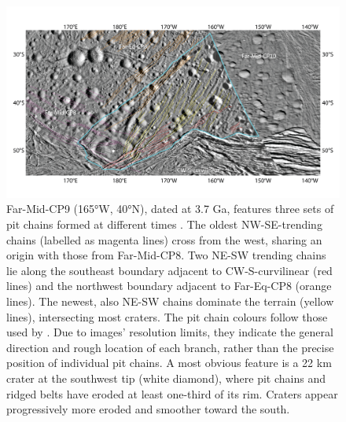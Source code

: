 \documentclass[preprint,12pt,3p,times,authoryear]{elsarticle}
\begin{document}
{\begin{figure}[t]
    \includegraphics[width=1.0\linewidth]{fig/FigS4B_Far-Mid-CP9.png}
    \caption{Far-Mid-CP9 (165°W, 40°N), dated at 3.7 Ga, features three sets of pit chains formed at different times \citep{Martin2014}. The oldest NW-SE-trending chains (labelled as magenta lines) cross from the west, sharing an origin with those from Far-Mid-CP8. Two NE-SW trending chains lie along the southeast boundary adjacent to CW-S-curvilinear (red lines) and the northwest boundary adjacent to Far-Eq-CP8 (orange lines). The newest, also NE-SW chains dominate the terrain (yellow lines), intersecting most craters. The pit chain colours follow those used by \citet{Martin2014}. Due to images’ resolution limits, they indicate the general direction and rough location of each branch, rather than the precise position of individual pit chains. A most obvious feature is a 22 km crater at the southwest tip (white diamond), where pit chains and ridged belts have eroded at least one-third of its rim. Craters appear progressively more eroded and smoother toward the south.}
    \label{fig:app_erosion3}
\end{figure}

}
\end{document}
